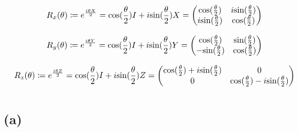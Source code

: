 \documentclass{article}
\begin{document}
\section{}

$$R_x(\theta)\coloneqq e^{\frac{i\theta X}{2}}=\textnormal{cos}(\frac{\theta}{2})I+i\textnormal{sin}(\frac{\theta}{2})X=
\begin{pmatrix}
\textnormal{cos}(\frac{\theta}{2}) & i\textnormal{sin}(\frac{\theta}{2})\\
i\textnormal{sin}(\frac{\theta}{2}) & \textnormal{cos}(\frac{\theta}{2})
\end{pmatrix}$$

$$R_y(\theta)\coloneqq e^{\frac{i\theta Y}{2}}=\textnormal{cos}(\frac{\theta}{2})I+i\textnormal{sin}(\frac{\theta}{2})Y=
\begin{pmatrix}
\textnormal{cos}(\frac{\theta}{2}) & \textnormal{sin}(\frac{\theta}{2})\\
-\textnormal{sin}(\frac{\theta}{2}) & \textnormal{cos}(\frac{\theta}{2})
\end{pmatrix}$$

$$R_z(\theta)\coloneqq e^{\frac{i\theta Z}{2}}=\textnormal{cos}(\frac{\theta}{2})I+i\textnormal{sin}(\frac{\theta}{2})Z=
\begin{pmatrix}
\textnormal{cos}(\frac{\theta}{2}) + i\textnormal{sin}(\frac{\theta}{2}) & 0\\
0 & \textnormal{cos}(\frac{\theta}{2}) - i\textnormal{sin}(\frac{\theta}{2})
\end{pmatrix}$$

\section{}

\subsection*{(a)}
\end{document}
